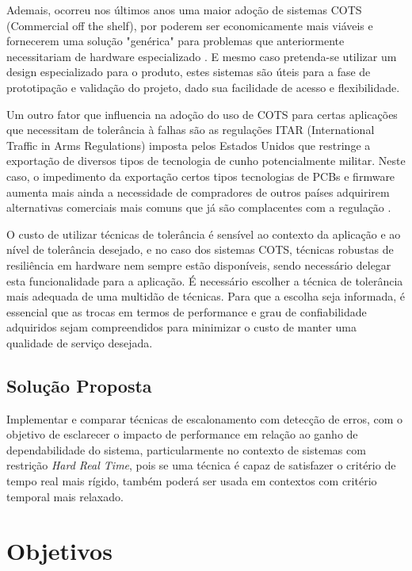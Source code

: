 Ademais, ocorreu nos últimos anos uma maior adoção de sistemas COTS (Commercial off the shelf), por poderem ser economicamente mais viáveis e fornecerem uma solução "genérica" para problemas que anteriormente necessitariam de hardware especializado \cite{CyberSecSpaceCOTS}. E mesmo caso pretenda-se utilizar um design especializado para o produto, estes sistemas são úteis para a fase de prototipação e validação do projeto, dado sua facilidade de acesso e flexibilidade.

Um outro fator que influencia na adoção do uso de COTS para certas aplicações que necessitam de tolerância à falhas são as regulações ITAR (International Traffic in Arms Regulations) imposta pelos Estados Unidos que restringe a exportação de diversos tipos de tecnologia de cunho potencialmente militar. Neste caso, o impedimento da exportação certos tipos  tecnologias de PCBs e firmware aumenta mais ainda a necessidade de compradores de outros países adquirirem alternativas comerciais mais comuns que já são complacentes com a regulação \cite{ITARPCBCompliance}.

O custo de utilizar técnicas de tolerância é sensível ao contexto da aplicação e ao nível de tolerância desejado, e no caso dos sistemas COTS, técnicas robustas de resiliência em hardware nem sempre estão disponíveis, sendo necessário delegar esta funcionalidade para a aplicação. É necessário escolher a técnica de tolerância mais adequada de uma multidão de técnicas. Para que a escolha seja informada, é essencial que as trocas em termos de performance e grau de confiabilidade adquiridos sejam compreendidos para minimizar o custo de manter uma qualidade de serviço desejada.

\subsection{Solução Proposta}

Implementar e comparar técnicas de escalonamento com detecção de erros, com o objetivo de esclarecer o impacto de performance em relação ao ganho de dependabilidade do sistema, particularmente no contexto de sistemas com restrição \textit{Hard Real Time}, pois se uma técnica é capaz de satisfazer o critério de tempo real mais rígido, também poderá ser usada em contextos com critério temporal mais relaxado.

\section{Objetivos}


